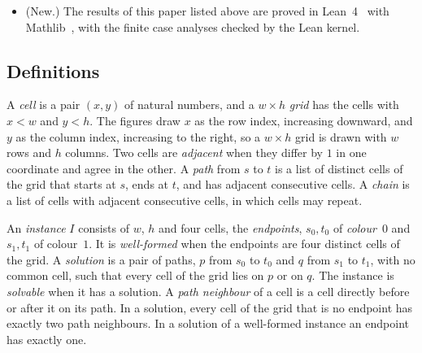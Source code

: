 \documentclass[11pt]{article}
\makeatletter
\newcommand{\secmark}[1]{\pdfsavepos\protected@write\@auxout{}{\string\secpos{#1}{\thepage}{\noexpand\the\noexpand\pdflastypos}}}
\def\secpos#1#2#3{}
\makeatother
\begin{document}
\begin{itemize}
  $w\times h$ grid (Theorems~\ref{thm:decide} and~\ref{thm:steps}). A construction returns only
  solutions, and one for every well-formed solvable instance, within $O(M^2)$ counted steps,
  $M=\max(w,h)$ (Theorems~\ref{thm:construct} and~\ref{thm:steps}). Counted steps charge a
  list operation by the length of the list, or by its square for removing duplicates and testing
  distinctness, and make arithmetic free (Section~\ref{sec:algo}), so the bounds are
  polynomial in $w$ and $h$, not in the bit length of the input.
\item (New.) The results of this paper listed above are proved in Lean~4~\cite{lean4} with Mathlib~\cite{mathlib20}, with
  the finite case analyses checked by the Lean kernel.
\end{itemize}

\secmark{defs}
\subsection{Definitions}\label{sec:defs}

A \emph{cell} is a pair $(x,y)$ of natural numbers, and a $w\times h$ \emph{grid} has the cells
with $x<w$ and $y<h$. The figures draw $x$ as the row index, increasing downward, and $y$ as the
column index, increasing to the right, so a $w\times h$ grid is drawn with $w$ rows and $h$
columns. Two cells are \emph{adjacent} when they differ by $1$ in one coordinate and agree in the
other. A \emph{path} from $s$ to $t$ is a list of distinct cells of the grid that starts at $s$,
ends at $t$, and has adjacent consecutive cells. A \emph{chain} is a list of cells with adjacent
consecutive cells, in which cells may repeat.

An \emph{instance} $I$ consists of $w$, $h$ and four cells, the \emph{endpoints}, $s_0,t_0$ of
\emph{colour}~$0$ and $s_1,t_1$ of colour~$1$. It is \emph{well-formed} when the endpoints are
four distinct cells of the grid. A \emph{solution} is a pair of paths, $p$ from $s_0$ to $t_0$ and
$q$ from $s_1$ to $t_1$, with no common cell, such that every cell of the grid lies on $p$ or on
$q$. The instance is \emph{solvable} when it has a solution.
A \emph{path neighbour} of a cell is a cell directly before or after it on its path. In a solution,
every cell of the grid that is no endpoint has exactly two path neighbours. In a solution of a
well-formed instance an endpoint has exactly one.
\end{document}
